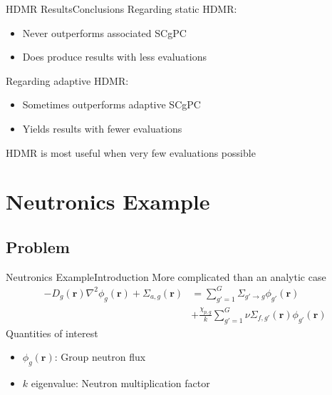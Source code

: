 \documentclass{beamer}
\begin{document}
\begin{frame}{HDMR Results}{Conclusions}\vspace{-20pt}
  \vfill
Regarding static HDMR:
\begin{itemize}
  \item Never outperforms associated SCgPC
  \item Does produce results with less evaluations
\end{itemize}
  \vfill
Regarding adaptive HDMR:
\begin{itemize}
  \item Sometimes outperforms adaptive SCgPC
  \item Yields results with fewer evaluations
\end{itemize}
  \vfill
HDMR is most useful when very few evaluations possible
  \vfill
\end{frame}




\section{Neutronics Example}
\subsection{Problem}
\begin{frame}{Neutronics Example}{Introduction}\vspace{-20pt}
  More complicated than an analytic case
\begin{align*}
  -D_g(\mathbf{r})\nabla^2\phi_g(\mathbf{r}) + \Sigma_{a,g}(\mathbf{r}) &=
           \sum_{g'=1}^G \Sigma_{g'\to g}\phi_{g'}(\mathbf{r})\\
  & +\frac{\chi_{p,g}}{k}\sum_{g'=1}^G \nu\Sigma_{f,g'}(\mathbf{r})\phi_{g'}(\mathbf{r})
\end{align*}
  Quantities of interest
  \begin{itemize}
    \item $\phi_g(\mathbf{r})$: Group neutron flux
    \item $k$ eigenvalue: Neutron multiplication factor
  \end{itemize}
\end{frame}
\end{document}
